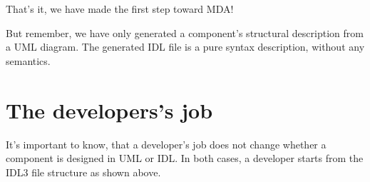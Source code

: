 That's it, we have made the first step toward MDA! 

But remember, we have only generated a component's structural description from
a UML diagram. The generated IDL file is a pure syntax description, without 
any semantics.  


\section{The developers's job}

It's important to know, that a developer's job does not change whether a 
component is designed in UML or IDL.
In both cases, a developer starts from the IDL3 file structure as shown above.
